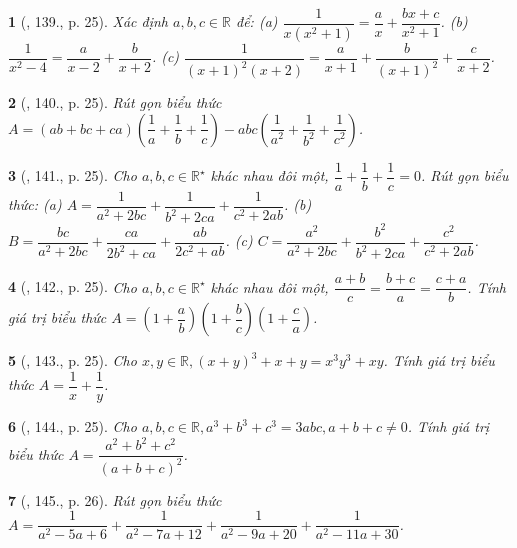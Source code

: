 \documentclass{article}
\newtheorem{baitoan}{}
\begin{document}
\begin{baitoan}[\cite{Binh_Toan_8_tap_1}, 139., p. 25]
	Xác định $a,b,c\in\mathbb{R}$ để: (a) $\dfrac{1}{x(x^2 + 1)} = \dfrac{a}{x} + \dfrac{bx + c}{x^2 + 1}$. (b) $\dfrac{1}{x^2 - 4} = \dfrac{a}{x - 2} + \dfrac{b}{x + 2}$. (c) $\dfrac{1}{(x + 1)^2(x + 2)} = \dfrac{a}{x + 1} + \dfrac{b}{(x + 1)^2} + \dfrac{c}{x + 2}$.
\end{baitoan}

\begin{baitoan}[\cite{Binh_Toan_8_tap_1}, 140., p. 25]
	Rút gọn biểu thức $A = (ab + bc + ca)\left(\dfrac{1}{a} + \dfrac{1}{b} + \dfrac{1}{c}\right) - abc\left(\dfrac{1}{a^2} + \dfrac{1}{b^2} + \dfrac{1}{c^2}\right)$.
\end{baitoan}

\begin{baitoan}[\cite{Binh_Toan_8_tap_1}, 141., p. 25]
	Cho $a,b,c\in\mathbb{R}^\star$ khác nhau đôi một, $\dfrac{1}{a} + \dfrac{1}{b} + \dfrac{1}{c} = 0$. Rút gọn biểu thức: (a) $A = \dfrac{1}{a^2 + 2bc} + \dfrac{1}{b^2 + 2ca} + \dfrac{1}{c^2 + 2ab}$. (b) $B = \dfrac{bc}{a^2 + 2bc} + \dfrac{ca}{2b^2 + ca} + \dfrac{ab}{2c^2 + ab}$. (c) $C = \dfrac{a^2}{a^2 + 2bc} + \dfrac{b^2}{b^2 + 2ca} + \dfrac{c^2}{c^2 + 2ab}$.
\end{baitoan}

\begin{baitoan}[\cite{Binh_Toan_8_tap_1}, 142., p. 25]
	Cho $a,b,c\in\mathbb{R}^\star$ khác nhau đôi một, $\dfrac{a + b}{c} = \dfrac{b + c}{a} = \dfrac{c + a}{b}$. Tính giá trị biểu thức $A = \left(1 + \dfrac{a}{b}\right)\left(1 + \dfrac{b}{c}\right)\left(1 + \dfrac{c}{a}\right)$.
\end{baitoan}

\begin{baitoan}[\cite{Binh_Toan_8_tap_1}, 143., p. 25]
	Cho $x,y\in\mathbb{R},(x + y)^3 + x + y = x^3y^3 + xy$. Tính giá trị biểu thức $A = \dfrac{1}{x} + \dfrac{1}{y}$.
\end{baitoan}

\begin{baitoan}[\cite{Binh_Toan_8_tap_1}, 144., p. 25]
	Cho $a,b,c\in\mathbb{R},a^3 + b^3 + c^3 = 3abc,a + b + c\ne0$. Tính giá trị biểu thức $A = \dfrac{a^2 + b^2 + c^2}{(a + b + c)^2}$.
\end{baitoan}

\begin{baitoan}[\cite{Binh_Toan_8_tap_1}, 145., p. 26]
	Rút gọn biểu thức $A = \dfrac{1}{a^2 - 5a + 6} + \dfrac{1}{a^2 - 7a + 12} + \dfrac{1}{a^2 - 9a + 20} + \dfrac{1}{a^2 - 11a + 30}$.
\end{baitoan}
\end{document}
